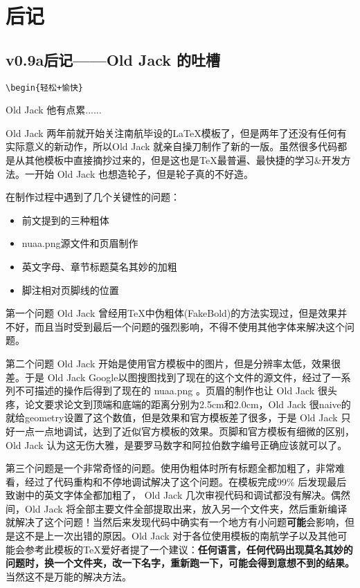 \chapter{后记}

\section{v0.9a后记——Old Jack 的吐槽}

\verb!\begin{轻松+愉快}!

Old Jack 他有点累......

Old Jack 两年前就开始关注南航毕设的\LaTeX 模板了，但是两年了还没有任何有实际意义的新动作，所以Old Jack 就亲自操刀制作了新的一版。虽然很多代码都是从其他模板中直接摘抄过来的，但是这也是\TeX 最普遍、最快捷的学习\&开发方法。一开始 Old Jack 也想造轮子，但是轮子真的不好造。

在制作过程中遇到了几个关键性的问题：
\begin{itemize}
  \item 前文提到的三种粗体
  \item nuaa.png源文件和页眉制作
  \item 英文字母、章节标题莫名其妙的加粗
  \item 脚注相对页脚线的位置
\end{itemize}

第一个问题 Old Jack 曾经用\TeX 中伪粗体(FakeBold)的方法实现过，但是效果并不好，而且当时受到最后一个问题的强烈影响，不得不使用其他字体来解决这个问题。

第二个问题 Old Jack 开始是使用官方模板中的图片，但是分辨率太低，效果很差。于是 Old Jack Google以图搜图找到了现在的这个文件的源文件，经过了一系列不可描述的操作后得到了现在的 nuaa.png 。页眉的制作也让 Old Jack 很头疼，论文要求论文到顶端和底端的距离分别为2.5cm和2.0cm，Old Jack 很naive的就给geometry设置了这个数值，但是效果和官方模板差了很多，于是 Old Jack 只好一点一点地调试，达到了近似官方模板的效果。页脚和官方模板有细微的区别，Old Jack 认为这无伤大雅，是要罗马数字和阿拉伯数字编号正确应该就可以了。

第三个问题是一个非常奇怪的问题。使用伪粗体时所有标题全都加粗了，非常难看，经过了代码重构和不停地调试解决了这个问题。在模板完成99\% 后发现最后致谢中的英文字体全都加粗了， Old Jack 几次审视代码和调试都没有解决。偶然间，Old Jack 将全部主要文件全部提取出来，放入另一个文件夹，然后重新编译就解决了这个问题！当然后来发现代码中确实有一个地方有小问题\textbf{可能}会影响，但是这不是上一次出错的原因。Old Jack 对于各位使用模板的南航学子以及其他可能会参考此模板的\TeX 爱好者提了一个建议：\textbf{任何语言，任何代码出现莫名其妙的问题时，换一个文件夹，改一下名字，重新跑一下，可能会得到意想不到的结果。}当然这不是万能的解决方法。

